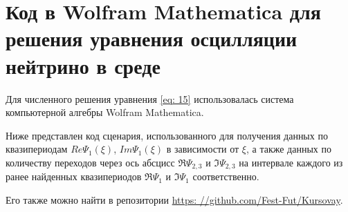 \section{Код в Wolfram Mathematica для решения уравнения осцилляции нейтрино в среде}
\label{app: code-python-vis}

Для численного решения уравнения \eqref{eq: 15} использовалась система компьютерной алгебры \textsf{Wolfram Mathematica}. 


Ниже представлен код сценария, использованного для получения данных по квазипериодам \(Re \Psi_1(\xi)\), \(Im\Psi_1(\xi)\) в зависимости от \(\xi\), а также данных по количеству переходов через ось абсцисс \(\Re\Psi_{2, 3}\) и \(\Im\Psi_{2, 3}\) на интервале каждого из ранее найденных квазипериодов \(\Re\Psi_1\) и \(\Im\Psi_1\) соответственно.

Его также можно найти в репозитории \url{https: //github.com/Fest-Fut/Kursovay}.

\inputminted[linenos,breaklines,fontsize=\scriptsize]{Markdown}{Sun_DOPRI_p5.md}

